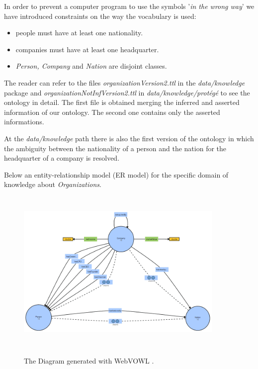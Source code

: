 In order to prevent a computer program to use the symbols '\textit{in the wrong way}' we have introduced  constraints on the way the vocabulary is used:
\begin{itemize}
\item people must have at least one nationality.
\item companies must have at least one headquarter. 
\item \textit{Person, Company} and \textit{Nation} are disjoint classes.
\end{itemize}

The reader can refer to the files \textit{organizationVersion2.ttl} in the \textit{data/knowledge} package and \textit{organizationNotInfVersion2.ttl} in \textit{data/knowledge/protégé} to see the ontology in detail. The first file is obtained merging the inferred and asserted information of our ontology. The second one contains only the asserted informations.  

At the \textit{data/knowledge} path there is also the first version of the ontology in which the ambiguity between the nationality of a person and the nation for the headquarter of a company is resolved.

Below an entity-relationship model (ER model) for the specific domain of knowledge about \textit{Organizations}.
\begin{figure}[H]
\centering
\includegraphics[width=10cm, height=8cm]{fig/OntologyDiagram.png}
\label{fig:ontologyDiagram}
    \caption{The Diagram generated with WebVOWL \cite{WebVOWL}.}
\end{figure}